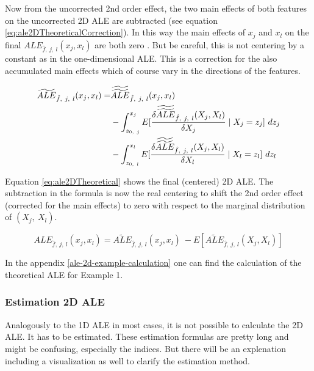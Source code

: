 \documentclass[
]{krantz}
\begin{document}
Now from the uncorrected 2nd order effect, the two main effects of both features on the uncorrected 2D ALE are subtracted (see equation \eqref{eq:ale2DTheoreticalCorrection}). In this way the main effects of \(x_j\) and \(x_l\) on the final \(ALE_{\hat{f},~j,~l}(x_j, x_l)\) are both zero \citep[page 9]{Apley2016}. But be careful, this is not centering by a constant as in the one-dimensional ALE. This is a correction for the also accumulated main effects which of course vary in the directions of the features.

\begin{align}
\widetilde{ALE}_{\hat{f},~j,~l}(x_j, x_l) 
= &\widetilde{\widetilde{ALE}}_{\hat{f},~j,~l}(x_j, x_l) \notag \\ 
&-  \int_{z_{0,~j}}^{x_j}  E[\frac{\delta\widetilde{\widetilde{ALE}}_{\hat{f},~j,~l}(X_j, X_l)}{\delta X_j}\mid X_j = z_j]~dz_j \notag \\
&- \int_{z_{0,~l}}^{x_l}  E[\frac{\delta\widetilde{\widetilde{ALE}}_{\hat{f},~j,~l}(X_j, X_l)}{\delta X_l}\mid X_l = z_l]~dz_l
\label{eq:ale2DTheoreticalCorrection}
\end{align}

Equation \eqref{eq:ale2DTheoretical} shows the final (centered) 2D ALE. The subtraction in the formula is now the real centering to shift the 2nd order effect (corrected for the main effects) to zero with respect to the marginal distribution of \((X_j, ~ X_l)\).

\begin{equation} 
ALE_{\hat{f},~j,~l}(x_j, x_l) = \widetilde{ALE}_{\hat{f},~j,~l}(x_j, x_l) ~ -  E[\widetilde{ALE}_{\hat{f},~j,~l}(X_j, X_l)]
  \label{eq:ale2DTheoretical}
\end{equation}

In the appendix \ref{ale-2d-example-calculation} one can find the calculation of the theoretical ALE for Example 1.

\hypertarget{estimation-2d-ale}{%
\subsubsection{Estimation 2D ALE}\label{estimation-2d-ale}}

Analogously to the 1D ALE in most cases, it is not possible to calculate the 2D ALE. It has to be estimated. These estimation formulas are pretty long and might be confusing, especially the indices. But there will be an explenation including a visualization as well to clarify the estimation method.
\end{document}
